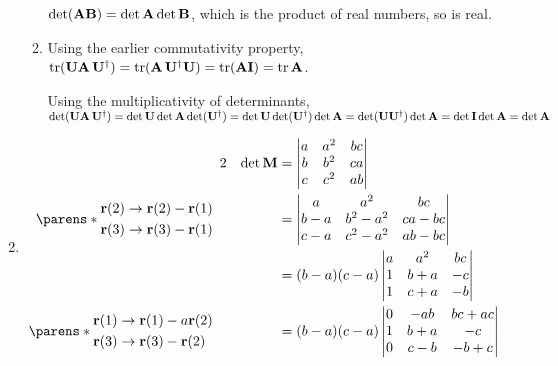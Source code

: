 \documentclass[fleqn,a4paper,11pt]{article}
\begin{document}
\begin{enumerate}[label=\textbf{\arabic*.}]
\begin{enumerate}[label=(\roman*)]
      \(\det(\mathbf{A}\mathbf{B}) = \det\mathbf{A}\det\mathbf{B}\), which is the product of
      real numbers, so is real.
     \item Using the earlier commutativity property,
      \(\operatorname{tr}(\mathbf{U}\mathbf{A}\,\mathbf{U}^\dag)
        = \operatorname{tr}(\mathbf{A}\,\mathbf{U}^\dag\mathbf{U}) = \operatorname{tr}(\mathbf{A}\mathbf{I}) = \operatorname{tr}\mathbf{A}\).

      Using the multiplicativity of determinants,
      \(\det(\mathbf{U}\mathbf{A}\,\mathbf{U}^\dag)
        = \det\mathbf{U}\det\mathbf{A}\det(\mathbf{U}^\dag)
        = \det\mathbf{U}\det(\mathbf{U}^\dag)\det\mathbf{A}
        = \det(\mathbf{U}\mathbf{U}^\dag)\det\mathbf{A}
        = \det\mathbf{I} \det\mathbf{A}
        = \det \mathbf{A}
        \)
   \end{enumerate}
  \item
   \begin{alignat*} 2
    && \det \mat M
     &= \begin{vmatrix}
      a & a^2 & bc \\
      b & b^2 & ca \\
      c & c^2 & ab
     \end{vmatrix} \\
    \parens*{
     \begin{aligned}
      \vec r(2) &\to \vec r(2) - \vec r(1) \\
      \vec r(3) &\to \vec r(3) - \vec r(1)
     \end{aligned}} \quad
    && &= \begin{vmatrix}
      a & a^2 & bc \\
      b - a & b^2 - a^2 & ca - bc \\
      c - a & c^2 - a^2 & ab - bc
     \end{vmatrix} \\
    && &= (b - a)(c - a)\begin{vmatrix}
      a & a^2 & bc \\
      1 & b + a & -c \\
      1 & c + a & -b
     \end{vmatrix} \\
    \parens*{
     \begin{aligned}
      \vec r(1) &\to \vec r(1) - a\vec r(2) \\
      \vec r(3) &\to \vec r(3) - \vec r(2)
     \end{aligned}} \quad
    && &= (b - a)(c - a)\begin{vmatrix}
      0 & -ab & bc + ac \\
      1 & b + a & -c \\
      0 & c - b & -b + c

\end{vmatrix}
\end{alignat*}
\end{enumerate}
\end{document}
